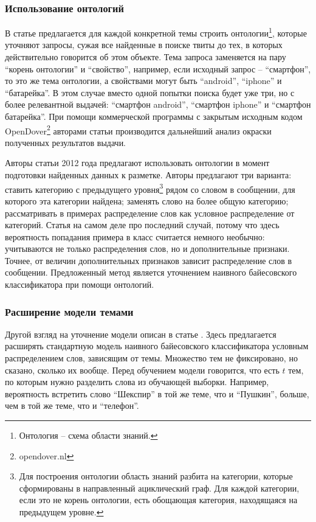 \subsubsection{Использование онтологий}
В статье \cite{Kontopoulos2013} предлагается для каждой конкретной темы строить
онтологии\footnote{Онтология -- схема области знаний.}, которые уточняют запросы, сужая все
найденные в поиске твиты до тех, в которых действительно говорится об этом объекте. Тема запроса заменяется на пару ``корень
онтологии'' и ``свойство'', например, если исходный запрос -- ``смартфон'', то это же тема
онтологии, а свойствами могут быть ``android'', ``iphone'' и ``батарейка''. В этом случае вместо
одной попытки поиска будет уже три, но с более релевантной выдачей: ``смартфон android'', ``смартфон iphone'' и ``смартфон
батарейка''. При помощи коммерческой программы с закрытым исходным кодом
OpenDover\footnote{opendover.nl} авторами статьи производится дальнейший анализ окраски полученных результатов
выдачи.

Авторы статьи \cite{SaifHassanHeYulanAlani2012} 2012 года предлагают использовать онтологии в момент
подготовки найденных данных к разметке. Авторы предлагают три варианта: ставить
категорию с предыдущего уровня\footnote{Для построения онтологии область знаний разбита на категории, которые сформированы в направленный
  ациклический граф. Для каждой категории, если это не корень онтологии, есть обощающая категория,
  находящаяся на предыдущем уровне.}
рядом со словом в сообщении, для которого эта категории
найдена; заменять слово на более общую категорию; рассматривать в примерах распределение слов как
условное распределение от категорий. Статья на самом деле про последний случай, потому что здесь
вероятность попадания примера в класс считается немного необычно: учитываются не только
распределения слов, но и дополнительные признаки. Точнее, от величин дополнительных признаков
зависит распределение слов в сообщении. Предложенный метод является уточнением наивного байесовского
классификатора при помощи онтологий.

\subsubsection{Расширение модели темами}
Другой взгляд на уточнение модели описан в статье \cite{Celikyilmaz2010}. Здесь предлагается
расширять стандартную модель наивного байесовского классификатора условным распределением слов, зависящим
от темы. Множество тем не фиксировано, но сказано, сколько их вообще. Перед обучением модели
говорится, что есть $t$ тем, по которым нужно разделить слова из обучающей выборки. Например,
вероятность встретить слово ``Шекспир'' в той же теме, что и ``Пушкин'', больше, чем в той же теме,
что и ``телефон''.
